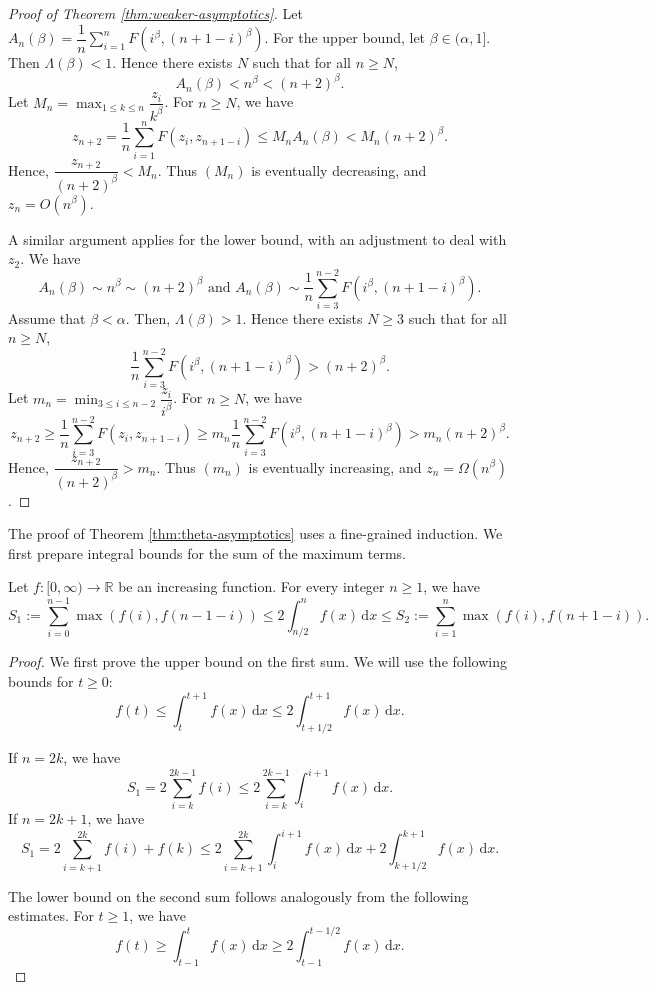 \begin{proof}[Proof of Theorem \ref{thm:weaker-asymptotics}]
  Let $A_n(\beta) = \dfrac{1}{n}\sum\limits_{i=1}^n F(i^\beta, (n+1-i)^\beta)$. For the upper bound, let $\beta \in (\alpha, 1]$. Then $\Lambda(\beta) < 1$. Hence there exists $N$ such that for all $n \ge N$,
  $$A_n(\beta) < n^\beta < (n+2)^\beta.$$
  Let $M_n = \max_{1\le k \le n} \dfrac{z_i}{k^\beta}$. For $n \ge N$, we have
  $$z_{n+2} = \dfrac{1}{n}\sum_{i=1}^n F\left(z_i, z_{n+1-i}\right) \le M_n A_n(\beta) < M_n (n+2)^\beta.$$
  Hence, $\dfrac{z_{n+2}}{(n+2)^\beta} < M_n$. Thus $(M_n)$ is eventually decreasing, and $z_n = O(n^\beta)$.

  A similar argument applies for the lower bound, with an adjustment to deal with $z_2$. We have
  $$A_n(\beta) \sim n^\beta \sim (n+2)^\beta \text{ and } A_n(\beta) \sim \dfrac{1}{n}\sum\limits_{i=3}^{n-2} F(i^\beta, (n+1-i)^\beta).$$
  Assume that $\beta < \alpha$. Then, $\Lambda(\beta) > 1$. Hence there exists $N\ge 3$ such that for all $n \ge N$,
  $$\dfrac{1}{n}\sum\limits_{i=3}^{n-2} F(i^\beta, (n+1-i)^\beta) > (n+2)^\beta.$$
  Let $m_n = \min_{3\le i \le n-2} \dfrac{z_i}{i^\beta}$. For $n \ge N$, we have
  $$z_{n+2} \ge \dfrac{1}{n}\sum_{i=3}^{n-2} F\left(z_i, z_{n+1-i}\right) \ge m_n \dfrac{1}{n}\sum\limits_{i=3}^{n-2} F(i^\beta, (n+1-i)^\beta) > m_n (n+2)^\beta.$$
  Hence, $\dfrac{z_{n+2}}{(n+2)^\beta} > m_n$. Thus $(m_n)$ is eventually increasing, and $z_n = \Omega(n^\beta)$.
\end{proof}

The proof of Theorem \ref{thm:theta-asymptotics} uses a fine-grained induction. We first prepare integral bounds for the sum of the maximum terms.

\begin{lemma}
  \label{lem:integral-bounds}
  Let $f: [0, \infty) \to \mathbb{R}$ be an increasing function. For every integer $n \ge 1$, we have
  $$S_1 := \sum_{i=0}^{n-1} \max(f(i), f(n-1-i)) \le 2\int_{n/2}^n f(x) \, \mathrm{d}x \le S_2 :=\sum_{i=1}^{n} \max(f(i), f(n+1-i)). $$
\end{lemma}

\begin{proof}
  We first prove the upper bound on the first sum. We will use the following bounds for $t\ge 0$:
  $$f(t) \le \int_{t}^{t+1} f(x) \, \mathrm{d}x \le 2 \int_{t+1/2}^{t+1} f(x) \, \mathrm{d}x.$$

  If $n=2k$, we have
  $$S_1 = 2 \sum_{i=k}^{2k-1} f(i) \le 2 \sum_{i=k}^{2k-1} \int_{i}^{i+1} f(x) \, \mathrm{d}x.$$
  If $n=2k+1$, we have
  $$ S_1 = 2 \sum_{i=k+1}^{2k} f(i) + f(k) \le 2 \sum_{i=k+1}^{2k} \int_i^{i+1} f(x) \, \mathrm{d}x + 2 \int_{k+1/2}^{k+1} f(x) \, \mathrm{d}x.$$

  The lower bound on the second sum follows analogously from the following estimates. For $t\ge 1$, we have
  $$f(t) \ge \int_{t-1}^{t} f(x) \, \mathrm{d}x \ge 2 \int_{t-1}^{t-1/2} f(x) \, \mathrm{d}x.$$
\end{proof}


